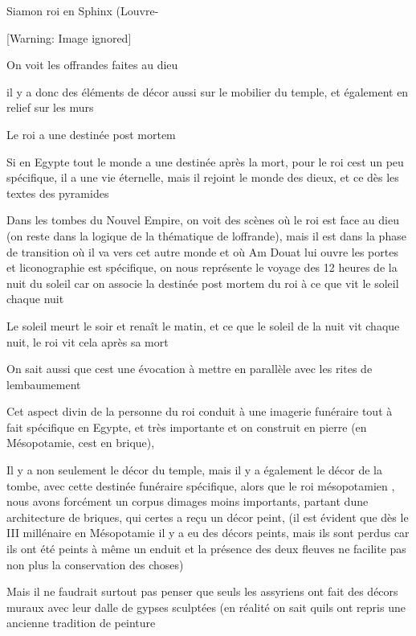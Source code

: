 \documentclass{article}
\begin{document}
Siamon roi en Sphinx (Louvre-

   [Warning: Image ignored] %
 

On voit les offrandes faites au dieu

il y a donc des éléments de décor aussi sur le mobilier du temple, et
également en relief sur les murs

Le roi a une destinée post mortem

Si en Egypte tout le monde a une destinée après la mort, pour le roi
c{\textquotesingle}est un peu spécifique, il a une vie éternelle, mais
il rejoint le monde des dieux, et ce dès les textes des pyramides

Dans les tombes du Nouvel Empire, on voit des scènes où le roi est face
au dieu (on reste dans la logique de la thématique de 
l{\textquotesingle}offrande), mais il est dans la phase de transition
où il va vers cet autre monde et où Am Douat lui ouvre les portes et
l{\textquotesingle}iconographie est spécifique, on nous représente le
voyage des 12 heures de la nuit du soleil car on associe la destinée
post mortem du roi à ce que vit le soleil chaque nuit

Le soleil meurt le soir et renaît le matin, et ce que le soleil de la
nuit vit chaque nuit, le roi vit cela après sa mort

On sait aussi que c{\textquotesingle}est une évocation à mettre en
parallèle avec les rites de l{\textquotesingle}embaumement

Cet aspect divin de la personne du roi conduit à une imagerie funéraire
tout à fait spécifique en Egypte, et très importante et on construit en
pierre (en Mésopotamie, c{\textquotesingle}est en brique), 

Il y a non seulement le décor du temple, mais il y a également le décor
de la tombe, avec cette destinée funéraire spécifique, alors que le roi
mésopotamien , nous avons forcément un corpus d{\textquotesingle}images
moins importants, partant d{\textquotesingle}une architecture de
briques, qui certes  a reçu un décor peint,  (il est évident que dès le
III millénaire en Mésopotamie il y a eu des décors peints, mais ils
sont perdus car ils ont été peints à même un enduit et la présence des
deux fleuves ne facilite pas non plus la conservation des choses)

Mais il ne faudrait surtout pas penser que seuls les assyriens ont fait
des décors muraux avec leur dalle de gypses sculptées (en réalité on
sait qu{\textquotesingle}ils ont repris une ancienne tradition de
peinture
\end{document}

